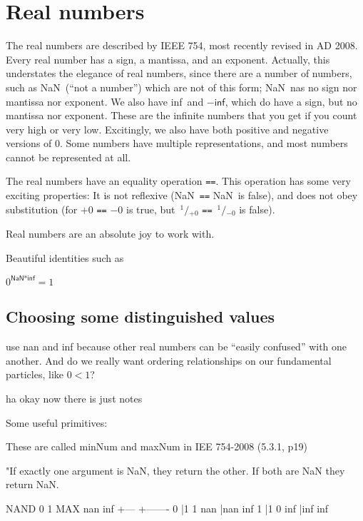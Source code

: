 \documentclass[twocolumn]{article}
\newcommand\sfrac[2]{\!{}\,^{#1}\!/{}\!_{#2}}
\newcommand\nan{\textsf{NaN}}
\renewcommand\inf{\textsf{inf}}
\begin{document}
\section{Real numbers}
The real numbers are described by IEEE 754, most recently revised in
AD 2008\cite{ieee754}. Every real number has a sign, a mantissa, and an
exponent. Actually, this understates the elegance of real numbers,
since there are a number of numbers, such as \nan\ (``not a number'')
which are not of this form; \nan\ nas no sign nor mantissa nor
exponent. We also have \inf\ and $-\inf$, which do have a sign, but no
mantissa nor exponent. These are the infinite numbers that you get if
you count very high or very low. Excitingly, we also have both
positive and negative versions of 0. Some numbers have multiple
representations, and most numbers cannot be represented at all.

The real numbers have an equality operation {\tt ==}. This operation
has some very exciting properties: It is not reflexive (\nan\ {\tt ==}
\nan\ is false), and does not obey substitution (for $+0$ {\tt ==} $-0$
is true, but $\sfrac{1}{+0}$ {\tt ==} $\sfrac{1}{-0}$ is false).

Real numbers are an absolute joy to work with.

Beautiful identities such as

$0^{\nan * \inf} = 1$


\subsection{Choosing some distinguished values} \label{sec:distinguished}



use nan and inf because other real numbers can be ``easily confused''
with one another. And do we really want ordering relationships on
our fundamental particles, like $0 < 1$?




ha okay now there is just notes

Some useful primitives:

        These are called minNum and maxNum in IEE 754-2008 (5.3.1, p19)

        "If exactly one argument is NaN, they return the other.
        If both are NaN they return NaN.

        NAND  0 1     MAX  nan inf
             +---         +-------
           0 |1 1     nan |nan inf
           1 |1 0     inf |inf inf
\end{document}
